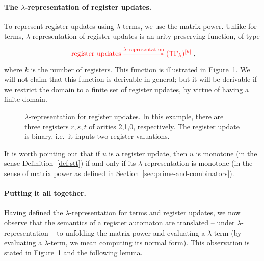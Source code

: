 \paragraph*{The $\lambda$-representation of register updates.} To represent register updates using $\lambda$-terms, we use  the matrix power. Unlike for terms,    $\lambda$-representation of register updates is an  arity preserving function, of type
\begin{align}\label{eq:lambda-representation-regup}
\ranked{
    \xymatrix@C=2cm{
 \text{register updates}    \ar[r]^-{\text{$\lambda$-representation}} &
 \mati k {(\tmonad\Gamma_\lambda)}
}
},
\end{align}
where $k$ is the number of registers. This function is illustrated in Figure~\ref{fig:labmda-representation-for-register-updates}. 
We will not claim that this function is derivable in general; but it will be derivable if we restrict the domain to a finite set of register updates, by virtue of having a finite domain.

\begin{figure}[]
    \centering
{}    
    \caption{$\lambda$-representation for register updates. In this example, there are three registers $r,s,t$ of arities 2,1,0, respectively. The register update is binary, i.e.~it inputs two register valuations.}
    \label{fig:labmda-representation-for-register-updates}
\end{figure}

It is worth pointing out that if $u$ is a register update, then $u$ is monotone (in the sense Definition~\ref{def:stt}) if and only if its $\lambda$-representation is monotone (in the sense of matrix power as defined in  Section~\ref{sec:prime-and-combinators}). 


\paragraph*{Putting it all together.}
Having defined the $\lambda$-representation for terms and register updates, we now observe  that the semantics of a register automaton are translated -- under $\lambda$-representation -- to unfolding the matrix power and evaluating a $\lambda$-term (by evaluating a $\lambda$-term, we mean computing its normal form).  This observation is stated in Figure~\ref{fig:labmda-representation-for-register-updates} and the following lemma.

